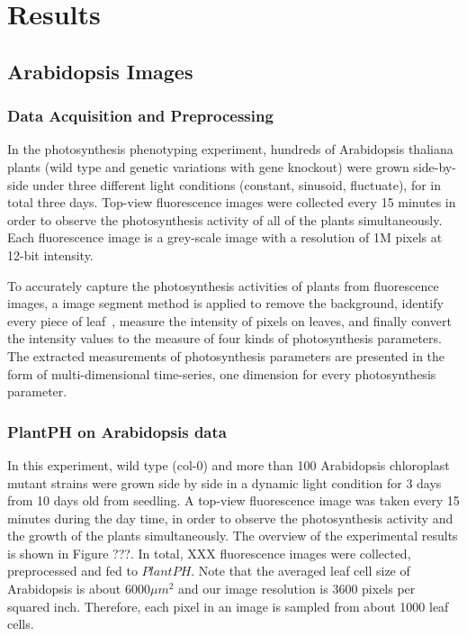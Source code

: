\documentclass{bioinfo}
\begin{document}
{\section{Results}

\subsection{Arabidopsis Images}

\subsubsection{Data Acquisition and Preprocessing}

In the photosynthesis phenotyping experiment, hundreds of Arabidopsis thaliana plants (wild type and genetic variations with gene knockout) were grown side-by-side under three different light conditions (constant, sinusoid, fluctuate), for in total three days.
%
Top-view fluorescence images were collected every 15 minutes in order to observe the photosynthesis activity of all of the plants simultaneously. Each fluorescence image is a grey-scale image with a resolution of 1M pixels at 12-bit intensity.

To accurately capture the photosynthesis activities of plants from fluorescence images, a image segment method is applied to remove the background, identify every piece of leaf~\citep{yin2014}, measure the intensity of pixels on leaves, and finally convert the intensity values to the measure of four kinds of photosynthesis parameters.
%
The extracted measurements of photosynthesis parameters are presented in the form of multi-dimensional time-series, one dimension for every photosynthesis parameter.
%

\subsubsection{PlantPH on Arabidopsis data}

In this experiment, wild type (col-0) and more than 100 Arabidopsis chloroplast mutant strains were grown side by side in a dynamic light condition for 3 days from 10 days old from seedling. A top-view fluorescence image was taken every 15 minutes during the day time, in order to observe the photosynthesis activity and the growth of the plants simultaneously. The overview of the experimental results is shown in Figure ???. In total, XXX fluorescence images were collected, preprocessed and fed to $PlantPH$. Note that the averaged leaf cell size of Arabidopsis is about $6000 \mu m^2$ \citep{gegas2014endopolyploidy} and our image resolution is 3600 pixels per squared inch. Therefore, each pixel in an image is sampled from about 1000 leaf cells.

}
\end{document}

